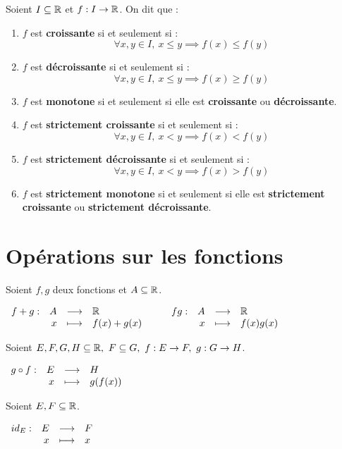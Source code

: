 \begin{definition}
	Soient $I \subseteq \mathbb{R}$ et $f : I \to \mathbb{R}$. On dit que :
    \begin{enumerate}
        \item $f$ est \textbf{croissante} si et seulement si :
        \[ \forall x, y \in I,\ x \leq y \implies f(x) \leq f(y) \]
        \item $f$ est \textbf{décroissante} si et seulement si : 
        \[ \forall x, y \in I,\ x \leq y \implies f(x) \geq f(y) \]
        \item $f$ est \textbf{monotone} si et seulement si elle est \textbf{croissante} ou \textbf{décroissante}.
        \item $f$ est \textbf{strictement croissante} si et seulement si : 
        \[ \forall x, y \in I,\ x < y \implies f(x) < f(y) \]
        \item $f$ est \textbf{strictement décroissante} si et seulement si :
        \[ \forall x, y \in I,\ x < y \implies f(x) > f(y) \]
        \item $f$ est \textbf{strictement monotone} si et seulement si elle est \textbf{strictement croissante} ou \textbf{strictement décroissante}.
    \end{enumerate}
\end{definition}

\section{Opérations sur les fonctions}
\begin{definition}
	Soient $f, g$ deux fonctions et $A \subseteq \mathbb{R}$.
	\begin{center}
		$
		\begin{array}{rrcl} f+g : & A & \longrightarrow & \mathbb{R} \\ & x & \longmapsto & f(x)+g(x) \end{array}
		\qquad
		\begin{array}{rrcl} fg : & A & \longrightarrow & \mathbb{R} \\ & x & \longmapsto & f(x)g(x) \end{array}
		$
	\end{center}
\end{definition}

\begin{definition}
	Soient $E, F, G, H \subseteq \mathbb{R},\ F \subseteq G,\ f : E \to F,\ g : G \to H$.
	\begin{center}
		$
		\begin{array}{rrcl} g \circ f : & E & \longrightarrow & H \\ & x & \longmapsto & g(f(x)) \end{array}
		$
	\end{center}
\end{definition}

\begin{definition}
    Soient $E, F \subseteq \mathbb{R}$.
	\begin{center}
		$
		\begin{array}{rrcl} id_E : & E & \longrightarrow & F \\ & x & \longmapsto & x \end{array}
		$
	\end{center}
\end{definition}

